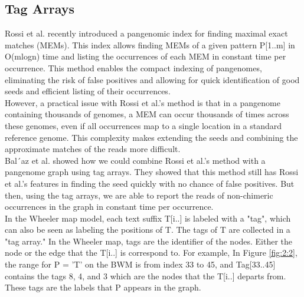 \documentclass[11pt]{ucthesis}
\begin{document}
\subsection{Tag Arrays}
Rossi et al. \cite{rossi2022moni} recently introduced a pangenomic index for finding maximal exact matches (MEMs). This index allows finding MEMs of a given pattern P[1..m] in O(mlogn) time and listing the occurrences of each MEM in constant time per occurrence. This method enables the compact indexing of pangenomes, eliminating the risk of false positives and allowing for quick identification of good seeds and efficient listing of their occurrences.\\
However, a practical issue with Rossi et al.'s method is that in a pangenome containing thousands of genomes, a MEM can occur thousands of times across these genomes, even if all occurrences map to a single location in a standard reference genome. This complexity makes extending the seeds and combining the approximate matches of the reads more difficult.\\
Bal´az et al. \cite{balavz2024wheeler} showed how we could combine Rossi et al.'s method with a pangenome graph using tag arrays. They showed that this method still has Rossi et al.'s features in finding the seed quickly with no chance of false positives. But then, using the tag arrays, we are able to report the reads of non-chimeric occurrences in the graph in constant time per occurrence. \\
In the Wheeler map model, each text suffix T[i..] is labeled with a "tag", which can also be seen as labeling the positions of T. The tags of T are collected in a "tag array." In the Wheeler map, tags are the identifier of the nodes. Either the node or the edge that the T[i..] is correspond to. For example, In Figure \ref{fig:2:2}, the range for P = 'T' on the BWM is from index 33 to 45, and Tag[33..45] contains the tags 8, 4, and 3 which are the nodes that the T[i..] departs from. These tags are the labels that P appears in the graph. 
\end{document}

